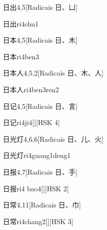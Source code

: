 \begin{entry}{日出}{4,5}[Radicais ⽇、⼐]
  \begin{phonetics}{日出}{ri4chu1}
  \end{phonetics}
\end{entry}

\begin{entry}{日本}{4,5}[Radicais ⽇、⽊]
  \begin{phonetics}{日本}{ri4ben3}
  \end{phonetics}
\end{entry}

\begin{entry}{日本人}{4,5,2}[Radicais ⽇、⽊、⼈]
  \begin{phonetics}{日本人}{ri4ben3ren2}
  \end{phonetics}
\end{entry}

\begin{entry}{日记}{4,5}[Radicais ⽇、⾔]
  \begin{phonetics}{日记}{ri4ji4}[][HSK 4]
  \end{phonetics}
\end{entry}

\begin{entry}{日光灯}{4,6,6}[Radicais ⽇、⼉、⽕]
  \begin{phonetics}{日光灯}{ri4guang1deng1}
  \end{phonetics}
\end{entry}

\begin{entry}{日报}{4,7}[Radicais ⽇、⼿]
  \begin{phonetics}{日报}{ri4 bao4}[][HSK 2]
  \end{phonetics}
\end{entry}

\begin{entry}{日常}{4,11}[Radicais ⽇、⼱]
  \begin{phonetics}{日常}{ri4chang2}[][HSK 3]
  \end{phonetics}
\end{entry}

